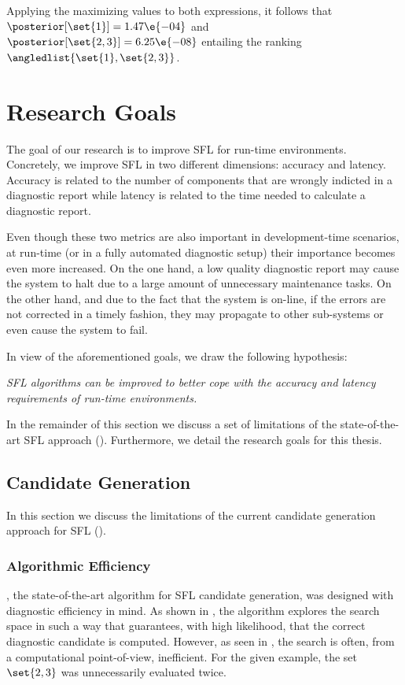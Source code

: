 Applying the maximizing values to both expressions, it follows that
$\posterior[\set{1}] = 1.47\e{-04}$ and
$\posterior[\set{2,3}] = 6.25\e{-08}$ entailing the ranking
$\angledlist{\set{1}, \set{2,3}}$.




\section{Research Goals}
\label{sec:intro:research-goals}
The goal of our research is to improve \ac{SFL} for run-time
environments.
%
Concretely, we improve \ac{SFL} in two different dimensions: accuracy
and latency.
%
Accuracy is related to the number of components that are wrongly
indicted in a diagnostic report while latency is related to the time
needed to calculate a diagnostic report.

Even though these two metrics are also important in development-time
scenarios, at run-time (or in a fully automated diagnostic setup)
their importance becomes even more increased.
%
On the one hand, a low quality diagnostic report may cause the system
to halt due to a large amount of unnecessary maintenance tasks.
%
On the other hand, and due to the fact that the system is on-line, if
the errors are not corrected in a timely fashion, they may propagate
to other sub-systems or even cause the system to fail.

In view of the aforementioned goals, we draw the following hypothesis:
\begin{center}
  \textit{\acl{SFL} algorithms can be improved to better cope with the
    accuracy and latency requirements of run-time environments.}
\end{center}

In the remainder of this section we discuss a set of limitations of
the state-of-the-art \ac{SFL} approach ().
%
Furthermore, we detail the research goals for this thesis.

\subsection{Candidate Generation}
\label{sec:intro:research-goals:candidate-generation}
In this section we discuss the limitations of the current candidate
generation approach for \ac{SFL}
().
%


\subsubsection{Algorithmic Efficiency}
\label{sec:intro:research-goals:algorithmic-efficiency}
\staccato{}, the state-of-the-art algorithm for \ac{SFL} candidate
generation, was designed with diagnostic efficiency in mind.
%
As shown in \cite{Abreu09b}, the algorithm explores the search space
in such a way that guarantees, with high likelihood, that the correct
diagnostic candidate is computed.
%
However, as seen in , the
search is often, from a computational point-of-view, inefficient.
%
For the given example, the set $\set{2,3}$ was unnecessarily evaluated
twice.

